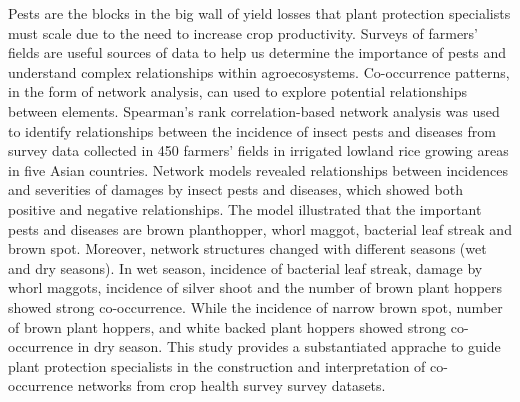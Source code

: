 \documentclass[12pt,a4paper]{article}
\begin{document}
%
%
%
%
Pests are the blocks in the big wall of yield losses that plant protection specialists must scale due to the need to increase crop productivity. Surveys of farmers' fields are useful sources of data to help us determine the importance of pests and understand complex relationships within agroecosystems. Co-occurrence patterns, in the form of network analysis, can used to explore potential relationships between elements. Spearman's rank correlation-based network analysis was used to identify relationships between the incidence of insect pests and diseases from survey data collected in 450 farmers' fields in irrigated lowland rice growing areas in five Asian countries. Network models revealed relationships between incidences and severities of damages by insect pests and diseases, which showed both positive and negative relationships. The model illustrated that the important pests and diseases are brown planthopper, whorl maggot, bacterial leaf streak and brown spot. Moreover, network structures changed with different seasons (wet and dry seasons). In wet season, incidence of bacterial leaf streak, damage by whorl maggots, incidence of silver shoot and the number of brown plant hoppers showed strong co-occurrence. While the incidence of narrow brown spot, number of brown plant hoppers, and white backed plant hoppers showed strong co-occurrence in dry season. This study provides a substantiated apprache to guide plant protection specialists in the construction and interpretation of co-occurrence networks from crop health survey survey datasets.
 
\end{document}
